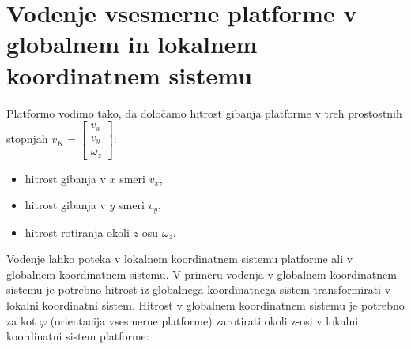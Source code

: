 \section{Vodenje vsesmerne platforme v globalnem in lokalnem koordinatnem sistemu}

Platformo vodimo tako, da določamo hitrost gibanja platforme v treh prostostnih stopnjah $v_K = \begin{bmatrix}
v_x \\ v_y \\ \omega_z \end{bmatrix}$:
\begin{itemize}
\item hitrost gibanja v $x$ smeri $v_x$,
\item hitrost gibanja v $y$ smeri $v_y$,
\item hitrost rotiranja okoli $z$ osu $\omega_z$.
\end{itemize}

Vodenje lahko poteka v lokalnem koordinatnem sistemu platforme ali v globalnem koordinatnem sistemu. V primeru vodenja v globalnem koordinatnem sistemu je potrebno hitrost iz globalnega koordinatnega sistem transformirati v lokalni koordinatni sistem. Hitrost v globalnem koordinatnem sistemu je potrebno za kot $\varphi$ (orientacija vsesmerne platforme) zarotirati okoli z-osi v lokalni koordinatni sistem platforme:

